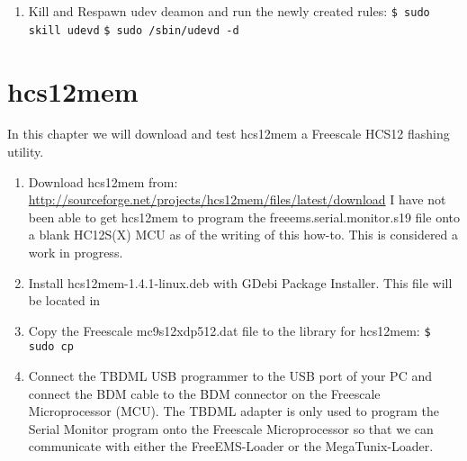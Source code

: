 \documentclass[12pt,notitlepage,onecolumn,oneside,openany]{memoir}
\begin{document}
\begin{enumerate}
\item \textsf{Kill and Respawn udev deamon and run the newly created rules:} \newline
      \texttt{\$ sudo skill udevd} \newline
      \texttt{\$ sudo /sbin/udevd -d} \newline

\end{enumerate}

\chapter{\textsf{hcs12mem}}
\textsf{In this chapter we will download and test hcs12mem a Freescale HCS12 flashing utility.} \newline

\begin{enumerate}
\item \textsf{Download hcs12mem from:} \newline
      \url{http://sourceforge.net/projects/hcs12mem/files/latest/download} \newline
      \textsf{I have not been able to get hcs12mem to program the freeems.serial.monitor.s19 file onto a blank HC12S(X) MCU as of the writing of this how-to.  This is considered a work in progress.} 

\item \textsf{Install hcs12mem-1.4.1-linux.deb with GDebi Package Installer. This file will be located in} \newline

\item \textsf{Copy the Freescale mc9s12xdp512.dat file to the library for hcs12mem:} \newline
      \texttt{\$ sudo cp } 

\item \textsf{Connect the TBDML USB programmer to the USB port of your PC and connect the BDM cable to the BDM connector on the Freescale Microprocessor (MCU).  The TBDML adapter is only used to program the Serial Monitor program onto the Freescale Microprocessor so that we can communicate with either the FreeEMS-Loader or the MegaTunix-Loader.}


\end{enumerate}
\end{document}
